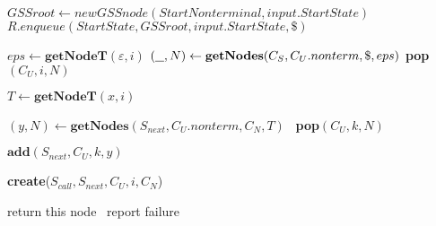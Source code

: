 \begin{algorithmic}
    \State $GSSroot\gets new GSSnode(StartNonterminal,input.StartState) $
    \State $R.enqueue(StartState, GSSroot, input.StartState, \$)$
    
    \State $eps \gets \textbf{getNodeT}(\varepsilon, i)$  
    \State $(\underline{\hspace{0.25cm}}, N) \gets \textbf{getNodes}(C_{S},C_{U}.nonterm, \$, eps)$
    \State \textbf{pop}$(C_{U},i,N)$
    \EndIf
    
            \State $T \gets \textbf{getNodeT}(x, i)$
            
            \State $(y, N) \gets \textbf{getNodes}(S_{next},C_{U}.nonterm, C_{N}, T)$
                \ \textbf{pop}$(C_{U},k,N)$ 
            \EndIf
            
            \State $\textbf{add}(S_{next}, C_{U}, k, y)$
            \EndFor
        \EndCase
    
            \State \textbf{create}($S_{call}, S_{next}, C_{U}, i, C_{N}$)
        \EndCase
        \EndSwitch
        
    \EndFor
    \EndWhile
    \State return this node
    \Else
    \ report failure
    \EndIf
\EndFunction
\end{algorithmic}